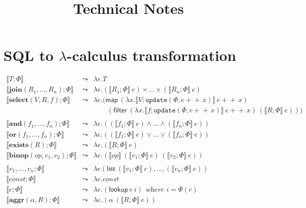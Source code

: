 \documentclass{article}
\newcommand{\concat}{\ensuremath{\!+\!\!\!\!+\!\,}}
\begin{document}
\title{Technical Notes}
\author{}
\date{}
\maketitle

\section*{SQL to $\lambda$-calculus transformation}


\[
\begin{array}{rcl}
 \llbracket T; \Phi  \rrbracket& \leadsto& \lambda e.T\\
\llbracket \mathbf{join}(R_1,...,R_n);\Phi \rrbracket &\leadsto& \lambda e.(\llbracket R_1; \Phi\rrbracket~e)\times...\times(\llbracket R_n;\Phi\rrbracket~e)\\
\llbracket \mathbf{select}(V, R, f);\Phi \rrbracket &\leadsto& \lambda e. (\mathsf{map}~(\lambda x.\llbracket V;\mathtt{update}(\Phi,e\concat x) \rrbracket~ e\concat x)\\
& & \qquad(\mathsf{filter}~(\lambda x.\llbracket f; \mathtt{update}(\Phi,e\concat x)\rrbracket~e\concat x)~ (\llbracket R;\Phi \rrbracket~e)))\\
\\
\llbracket \mathbf{and}(f_1,...,f_n);\Phi \rrbracket &\leadsto& \lambda e.((\llbracket f_1;\Phi \rrbracket~e) \land ... \land (\llbracket f_n;\Phi \rrbracket~e))\\
\llbracket \mathbf{or}(f_1,...,f_n);\Phi \rrbracket &\leadsto& \lambda e.((\llbracket f_1;\Phi \rrbracket~e) \lor ... \lor (\llbracket f_n;\Phi \rrbracket~e))\\
\llbracket\mathbf{exists}(R);\Phi \rrbracket &\leadsto& \lambda e. (\llbracket R;\Phi \rrbracket~e)\\
\llbracket \mathbf{binop}(\mathit{op}, v_1, v_2);\Phi\rrbracket &\leadsto&  \lambda e.(\llbracket \mathit{op} \rrbracket~(\llbracket v_1;\Phi \rrbracket~e)~(\llbracket v_2;\Phi \rrbracket~e))\\
\\
\llbracket v_1,...,v_n;\Phi \rrbracket & \leadsto &\lambda e(\mathsf{list}~(\llbracket v_1;\Phi\rrbracket~e),...,(\llbracket v_n;\Phi\rrbracket~e)) \\
\llbracket \mathit{const};\Phi \rrbracket & \leadsto & \lambda e.\mathit{const}\\
\llbracket \mathit{c};\Phi \rrbracket & \leadsto & \lambda e. (\mathsf{lookup}~e~i)~~\textit{where $i=\Phi(c)$}\\
\llbracket \mathbf{aggr}(\alpha, R);\Phi \rrbracket & \leadsto & \lambda e.(\alpha~(\llbracket R;\Phi\rrbracket~e))\\
\end{array}
\]

\end{document}
